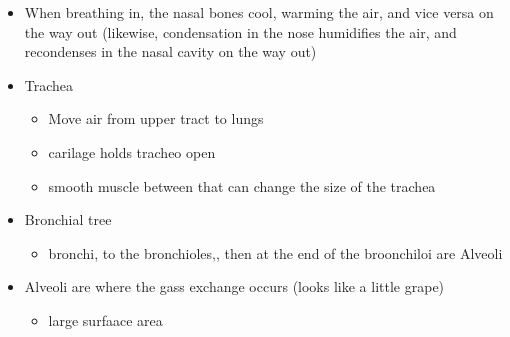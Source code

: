\documentclass{article}
\theoremstyle{definition}
\begin{document}
\begin{itemize}
\begin{itemize}
			\item When breathing in, the nasal bones cool, warming the air, and vice versa on the way out (likewise, condensation in the nose humidifies the air, and recondenses in the nasal cavity on the way out)
			\item Trachea
				\begin{itemize}
					\item Move air from upper tract to lungs
					\item carilage holds tracheo open
					\item smooth muscle between that can change the size of the trachea
				\end{itemize}
			\item Bronchial tree
				\begin{itemize}
					\item bronchi, to the bronchioles,, then at the end of the broonchiloi are Alveoli
				\end{itemize}
			\item Alveoli are where the gass exchange occurs (looks like a little grape)
				\begin{itemize}
					\item large surfaace area
				\end{itemize}
		\end{itemize}
\end{itemize}
\end{document}

